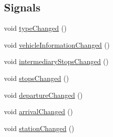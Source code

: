\subsection*{Signals}
\begin{DoxyCompactItemize}
\item 
void \mbox{\hyperlink{classCSA_1_1RouteLeg_a5ea5eef9f78700d451ddd2f0ad0ac208}{type\+Changed}} ()
\item 
void \mbox{\hyperlink{classCSA_1_1RouteLeg_abf2e225d549710146cdee9548d1c76c3}{vehicle\+Information\+Changed}} ()
\item 
void \mbox{\hyperlink{classCSA_1_1RouteLeg_a1369506613524120c93e6b5932a7ad95}{intermediary\+Stops\+Changed}} ()
\item 
void \mbox{\hyperlink{classCSA_1_1RouteLeg_a092966483399a1c895945178ed1353cf}{stops\+Changed}} ()
\item 
void \mbox{\hyperlink{classCSA_1_1RouteLeg_a7f70b16edb2c9aff18d75e7ea06e5d01}{departure\+Changed}} ()
\item 
void \mbox{\hyperlink{classCSA_1_1RouteLeg_a1163b0c9b0b0020677776c576b2fd73b}{arrival\+Changed}} ()
\item 
void \mbox{\hyperlink{classCSA_1_1RouteLeg_a0e0cfc76d7282cdedc17bf170b8a477d}{station\+Changed}} ()
\end{DoxyCompactItemize}
